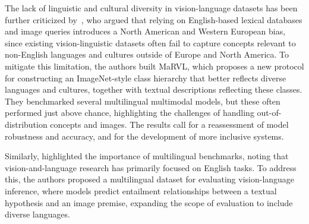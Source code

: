 The lack of linguistic and cultural diversity in vision-language datasets has been further criticized by~\citet{liu2021visually}, who argued that relying on English-based lexical databases and image queries introduces a North American and Western European bias, since existing vision-linguistic datasets often fail to capture concepts relevant to non-English languages and cultures outside of Europe and North America. To mitigate this limitation, the authors built MaRVL, which proposes a new protocol for constructing an ImageNet-style class hierarchy that better reflects diverse languages and cultures, together with textual descriptions reflecting these classes. They benchmarked several multilingual multimodal models, but these often performed just above chance, highlighting the challenges of handling out-of-distribution concepts and images. The results call for a reassessment of model robustness and accuracy, and for the development of more inclusive systems.

Similarly, \citet{bugliarello2022iglue} highlighted the importance of multilingual benchmarks, noting that vision-and-language research has primarily focused on English tasks. To address this, the authors proposed a multilingual dataset for evaluating vision-language inference, where models predict entailment relationships between a textual hypothesis and an image premise, expanding the scope of evaluation to include diverse languages.